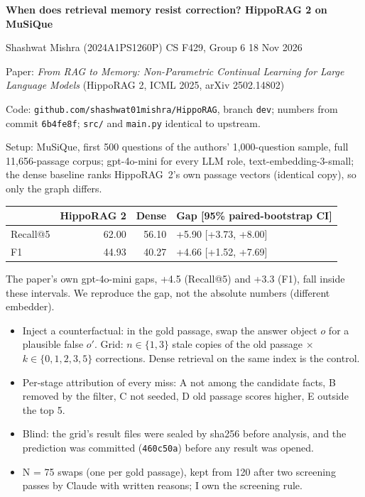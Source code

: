\documentclass[10pt,a4paper]{article}
\newcommand{\sect}[1]{\par\vspace{3pt}{\large\bfseries #1}\par\vspace{0pt}}
\begin{document}
{\Large\bfseries When does retrieval memory resist correction? HippoRAG 2 on MuSiQue}\par
\vspace{2pt}
Shashwat Mishra (2024A1PS1260P) \textbullet{} CS F429, Group 6 \textbullet{} 18 Nov 2026\par
Paper: \emph{From RAG to Memory: Non-Parametric Continual Learning for Large Language Models} (HippoRAG 2, ICML 2025, arXiv 2502.14802)\par
Code: \texttt{github.com/shashwat01mishra/HippoRAG}, branch \texttt{dev}; numbers from commit \texttt{6b4fe8f}; \texttt{src/} and \texttt{main.py} identical to upstream.

\sect{1. Reproduction}
Setup: MuSiQue, first 500 questions of the authors' 1,000-question sample, full 11,656-passage corpus;
gpt-4o-mini for every LLM role, text-embedding-3-small; the dense baseline ranks HippoRAG~2's own passage vectors (identical copy), so only the graph differs.

\begin{tabular}{@{}lrrl@{}}
\toprule
 & HippoRAG 2 & Dense & Gap [95\% paired-bootstrap CI] \\
\midrule
Recall@5 & 62.00 & 56.10 & +5.90 [+3.73, +8.00] \\  %
F1       & 44.93 & 40.27 & +4.66 [+1.52, +7.69] \\  %
\bottomrule
\end{tabular}

The paper's own gpt-4o-mini gaps, +4.5 (Recall@5) and +3.3 (F1), fall inside these intervals. %
We reproduce the gap, not the absolute numbers (different embedder).

\sect{2. Proposed improvement 1: an update-resistance protocol}
\begin{itemize}
\item Inject a counterfactual: in the gold passage, swap the answer object $o$ for a plausible false $o'$. Grid: $n \in \{1,3\}$ stale copies of the old passage $\times$ $k \in \{0,1,2,3,5\}$ corrections. Dense retrieval on the same index is the control.
\item Per-stage attribution of every miss: A not among the candidate facts, B removed by the filter, C not seeded, D old passage scores higher, E outside the top 5.
\item Blind: the grid's result files were sealed by sha256 before analysis, and the prediction was committed (\texttt{460c50a}) before any result was opened.
\item N = 75 swaps (one per gold passage), kept from 120 after two screening passes by Claude with written reasons; I own the screening rule. %
\end{itemize}
\end{document}
